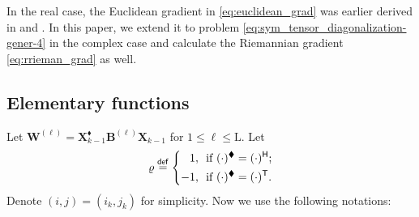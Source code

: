 \documentclass[final,onefignum,onetabnum]{siamart190516}
\newcommand{\matr}[1]{\boldsymbol{#1}}
\newcommand{\T}{{\sf T}} %
\renewcommand{\H}{{\sf H}} %
\newcommand{\eqdef}{\stackrel{\sf def}{=}}
\newcommand{\matrelem}[1]{\mathrm{#1}}
\renewcommand{\H}{{\sf H}}      %
\renewcommand{\TH}{{\blacklozenge}}
\begin{document}
\begin{remark}
In the real case, the Euclidean gradient in \cref{eq:euclidean_grad} was earlier derived in \cite[Eq. (6.3)]{afsari2004gradient} and \cite[Section 2.3]{bouchard2020approximate}.
In this paper, we extend it to problem \cref{eq:sym_tensor_diagonalization-gener-4} in the complex case and calculate the Riemannian gradient \cref{eq:rrieman_grad} as well. 
\end{remark}

\subsection{Elementary functions}\label{subsec:ele_func_trian}

Let $\matr{W}^{(\ell)}=\matr{X}_{k-1}^{\TH}\matr{B}^{(\ell)} \matr{X}_{k-1}$ for $1\leq\ell\leq \matrelem{L}$. 
Let
\begin{equation}\label{eq:varrho_1}
\varrho\eqdef\left\{
\begin{aligned}
1,\ \ & \textrm{if}\  (\cdot)^{\TH}=(\cdot)^{\H}; \\
-1,\ \ & \textrm{if}\  (\cdot)^{\TH}=(\cdot)^{\T}.
\end{aligned}
\right.
\end{equation}
Denote $(i,j)=(i_k,j_k)$ for simplicity. 
Now we use the following notations:
\end{document}
